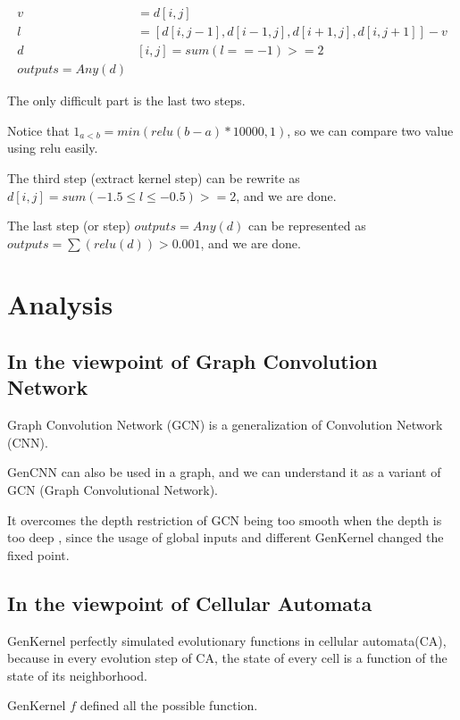 \documentclass{article}
\begin{document}
\begin{align*}
    v& = d[i,j]                                       \\
    l& = [d[i,j-1], d[i-1,j], d[i+1,j], d[i,j+1]] - v \\
    d&[i,j] = sum(l == -1) >= 2 \\
    outputs = Any(d)
\end{align*}

The only difficult part is the last two steps.

Notice that $1_{a<b} = min(relu(b-a)*10000,1)$, so we can compare two value using relu easily.

The third step (extract kernel step) can be rewrite as $d[i,j] = sum(-1.5\leq l \leq -0.5) >= 2 $, and we are done.

The last step (or step) $outputs = Any(d)$ can be represented as $outputs = \sum(relu(d)) > 0.001$, and we are done.

\section{Analysis}


\subsection{In the viewpoint of Graph Convolution Network}

Graph Convolution Network (GCN) is a generalization of Convolution Network (CNN).

GenCNN can also be used in a graph, and we can understand it as a variant of GCN \cite{kipf2016semi} (Graph Convolutional Network).

It overcomes the depth restriction of GCN being too smooth when the depth is too deep \cite{zhang2019graph}, since
the usage of global inputs and different GenKernel changed the fixed point.



\subsection{In the viewpoint of Cellular Automata}

GenKernel perfectly simulated evolutionary functions in cellular automata(CA), 
because in every evolution step of CA, the state of every cell is a function of the state of its neighborhood.

GenKernel $f$ defined all the possible function.
\end{document}
